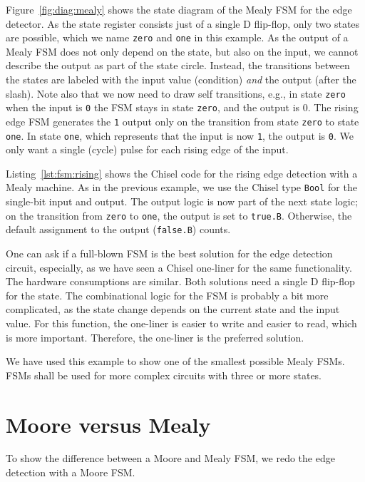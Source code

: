 \documentclass[%
    10pt,
    headinclude, footexclude,
    openright, %
    notitlepage,
    cleardoubleempty,
    headsepline,
    pointlessnumbers,
    bibtotoc, idxtotoc,
    ]{scrbook}
\newcommand{\code}[1]{{\lstinline[basicstyle=\small\ttfamily]{#1}}}
\begin{document}
Figure~\ref{fig:diag:mealy} shows the state diagram of the Mealy FSM for the
edge detector. As the state register consists just of a single D flip-flop,
only two states are possible, which we name \code{zero} and \code{one} in this
example.
As the output of a Mealy FSM does not only depend on the state, but also
on the input, we cannot describe the output as part of the state circle.
Instead, the transitions between the states are labeled with the input
value (condition) \emph{and} the output (after the slash).
Note also that we now need to draw self transitions, e.g., in state \code{zero} when
the input is \code{0} the FSM stays in state \code{zero}, and the output is {0}.
The rising edge FSM generates the \code{1} output only on the transition
from state \code{zero} to state \code{one}. In state \code{one}, which represents
that the input is now \code{1}, the output is \code{0}. We only want a single (cycle)
pulse for each rising edge of the input.


Listing~\ref{lst:fsm:rising} shows the Chisel code for the rising edge detection
with a Mealy machine.
As in the previous example, we use the Chisel type \code{Bool} for the
single-bit input and output.
The output logic is now part of the next state logic; on the transition from
\code{zero} to \code{one}, the output is set to \code{true.B}. Otherwise,
the default assignment to the output (\code{false.B}) counts.

One can ask if a full-blown FSM is the best solution for the edge detection circuit,
especially, as we have seen a Chisel one-liner for the same functionality.
The hardware consumptions are similar. Both solutions need a single D flip-flop
for the state. The combinational logic for the FSM is probably a bit more complicated, as
the state change depends on the current state and the input value.
For this function, the one-liner is easier to write and easier to read,
which is more important. Therefore, the one-liner is the preferred solution.

We have used this example to show one of the smallest possible Mealy FSMs.
FSMs shall be used for more complex circuits with three or more states.

\section{Moore versus Mealy}

To show the difference between a Moore and Mealy FSM, we redo the edge
detection with a Moore FSM.
\end{document}
